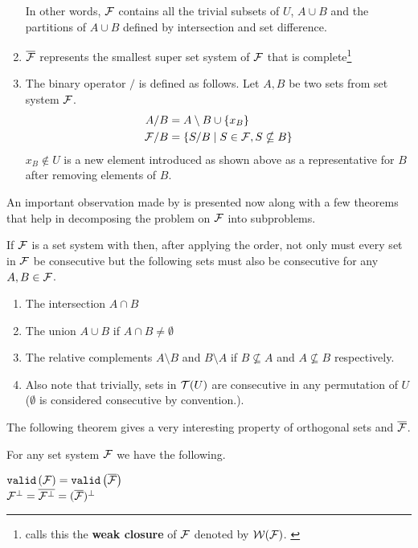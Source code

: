 \begin{definition}
\begin{enumerate}
    In other words, ${\cal F}$ contains all the trivial
    subsets of $U$, $A \cup B$ and the partitions of $A \cup B$
    defined by intersection and set difference.

  \item $\overline{{\cal F}}$ represents the smallest super set system of
    ${\cal F}$ that is complete\footnote{\cite[Def.~3.2]{mcc04} calls
      this the \textbf{ weak closure} of ${\cal F}$ denoted by
      ${\cal W}({\cal F})$. \label{mcc3}}

  \item \label{def::slashop} The binary operator $/$ is defined as
    follows. Let $A, B$ be two sets from set system ${\cal F}$.
    \begin{align*}
      A/B &= A \setminus B \cup \{x_B\}\\
      {\cal F}/B &= \{ S/B \mid S \in {\cal F}, S \nsubseteq B \}
    \end{align*}
    $x_B \notin U$ is a new element introduced as shown above as a
    representative for $B$ after removing elements of $B$.
 \end{enumerate}
  \dstop
\end{definition}


An important observation made by \cite{mm96} is presented now along
with a few theorems that help in decomposing the \COP problem on ${\cal F}$
into subproblems.

\begin{observation}[{\cite[Sec.~3]{mm96}}]
  If ${\cal F}$ is a set system with \COP then, after applying the \COP
  order, not only must every set in ${\cal F}$ be consecutive but the
  following sets must also be consecutive for any $A, B \in {\cal F}$.
\begin{enumerate}
  \item The intersection $A \cap B$ 
  \item The union $A \cup B$ if $A \cap B \ne \emptyset$
  \item The relative complements $A \setminus B$ and $B \setminus A$
    if $B \nsubseteq A$ and $A \nsubseteq B$ respectively.
  \item Also note that trivially, sets in ${\cal T}(U)$ are consecutive in
    any permutation of $U$ ($\emptyset$ is considered
      consecutive by convention.).
\end{enumerate}
\end{observation}

The following theorem gives a very interesting property of orthogonal
sets and $\overline{{\cal F}}$.

\begin{theoremsansproof}[{\cite[Th.~3,6]{mm96}}]
  \label{th:validcop}
  For any set system ${\cal F}$ we have the following. \par
  \centering
    ${\tt valid}\left({\cal F}\right) = {\tt valid}\left(\overline{{\cal F}}\right)$ \\
    ${\cal F}^{\bot} = \overline{{\cal F}^{\bot}} = (\overline{{\cal F}})^{\bot}$
\end{theoremsansproof}

